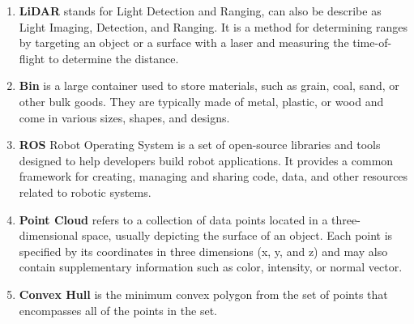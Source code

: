 \begin{enumerate}
	\item \textbf{LiDAR} \textemdash stands for Light Detection and Ranging, can also be describe as Light Imaging, Detection, and Ranging. It is a method for determining ranges by targeting an object or a surface with a laser and measuring the time-of-flight to determine the distance.

	\item \textbf{Bin} \textemdash is a large container used to store materials, such as grain, coal, sand, or other bulk goods. They are typically made of metal, plastic, or wood and come in various sizes, shapes, and designs.

	\item \textbf{ROS} \textemdash Robot Operating System is a set of open-source libraries and tools designed to help developers build robot applications. It provides a common framework for creating, managing and sharing code, data, and other resources related to robotic systems.

	\item \textbf{Point Cloud} \textemdash refers to a collection of data points located in a three-dimensional space, usually depicting the surface of an object. Each point is specified by its coordinates in three dimensions (x, y, and z) and may also contain supplementary information such as color, intensity, or normal vector.

	\item \textbf{Convex Hull} \textemdash is the minimum convex polygon from the set of points that encompasses all of the points in the set.

\end{enumerate}